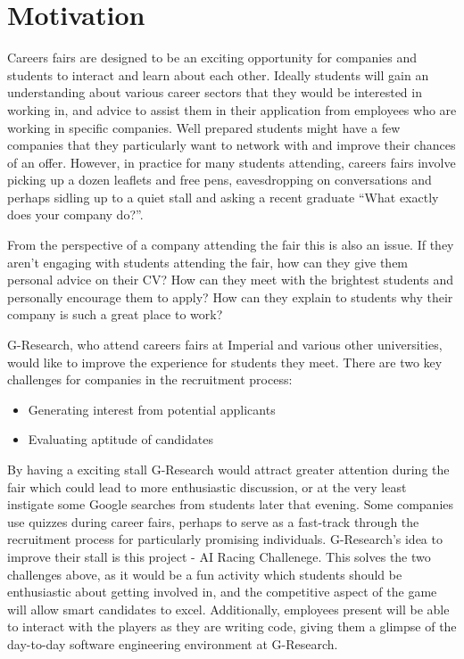 \section{Motivation}
Careers fairs are designed to be an exciting opportunity for companies and students to interact and learn about each other. Ideally students will gain an understanding about various career sectors that they would be interested in working in, and advice to assist them in their application from employees who are working in specific companies. Well prepared students might have a few companies that they particularly want to network with and improve their chances of an offer. However, in practice for many students attending, careers fairs involve picking up a dozen leaflets and free pens, eavesdropping on conversations and perhaps sidling up to a quiet stall and asking a recent graduate ``What exactly does your company do?''.

From the perspective of a company attending the fair this is also an issue. If they aren't engaging with students attending the fair, how can they give them personal advice on their CV? How can they meet with the brightest students and personally encourage them to apply? How can they explain to students why their company is such a great place to work?

G-Research, who attend careers fairs at Imperial and various other universities, would like to improve the experience for students they meet.  There are two key challenges for companies in the recruitment process:
\begin{itemize}
	\item Generating interest from potential applicants
	\item Evaluating aptitude of candidates
\end{itemize}
By having a exciting stall G-Research would attract greater attention during the fair which could lead to more enthusiastic discussion, or at the very least instigate some Google searches from students later that evening. Some companies use quizzes during career fairs, perhaps to serve as a fast-track through the recruitment process for particularly promising individuals. G-Research's idea to improve their stall is this project - AI Racing Challenege. This solves the two challenges above, as it would be a fun activity which students should be enthusiastic about getting involved in, and the competitive aspect of the game will allow smart candidates to excel. Additionally, employees present will be able to interact with the players as they are writing code, giving them a glimpse of the day-to-day software engineering environment at G-Research.
